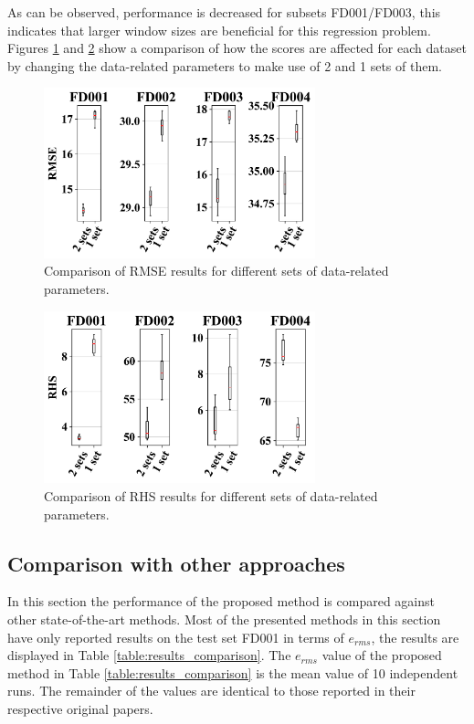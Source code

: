 \documentclass[12pt]{IEEEtran}%
\begin{document}
As can be observed, performance is decreased for subsets FD001/FD003, this indicates that larger window sizes are beneficial for this regression problem. Figures \ref{fig:scores_rmse} and \ref{fig:scores_rhs} show a comparison of how the scores are affected for each dataset by changing the data-related parameters to make use of 2 and 1 sets of them.

\begin{figure}[!htb]
\centering
\includegraphics[width=0.7\textwidth]{../img/rmse_comparisson.png}
\caption{Comparison of RMSE results for different sets of data-related parameters.}
\label{fig:scores_rmse}
\end{figure}

\begin{figure}[!htb]
\centering
\includegraphics[width=0.7\textwidth]{../img/rhs_comparisson.png}
\caption{Comparison of RHS results for different sets of data-related parameters.}
\label{fig:scores_rhs}
\end{figure}

\subsection{Comparison with other approaches}

In this section the performance of the proposed method is compared against other state-of-the-art methods. Most of the presented methods in this section have only reported results on the test set FD001 in terms of $e_{rms}$, the results are displayed in Table \ref{table:results_comparison}. The $e_{rms}$ value of the proposed method in Table \ref{table:results_comparison} is the mean value of 10 independent runs. The remainder of the values are identical to those reported in their respective original papers.
\end{document}
